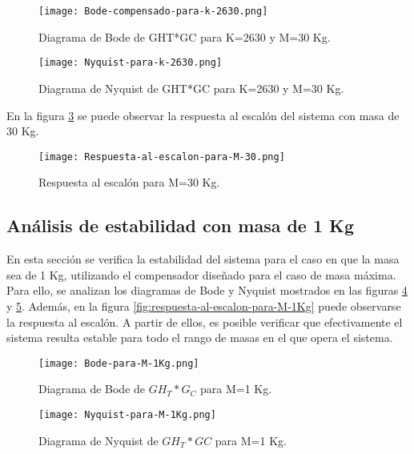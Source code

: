 \begin{figure}[H]
	\centering
	\texttt{[image: Bode-compensado-para-k-2630.png]}
	\caption{Diagrama de Bode de GHT*GC para K=2630 y M=30 Kg.}
	\label{fig:bode-compensado-para-k-2630}
\end{figure}

\begin{figure}[H]
	\centering
	\texttt{[image: Nyquist-para-k-2630.png]}
	\caption{Diagrama de Nyquist de GHT*GC para K=2630 y M=30 Kg.}
	\label{fig:nyquist-para-k-2630}
\end{figure}

\noindent En la figura \ref{fig:respuesta-al-escalon-para-M-30} se puede observar la respuesta al escal\'{o}n del sistema con masa de 30 Kg.


\begin{figure}[H]
	\centering
	\texttt{[image: Respuesta-al-escalon-para-M-30.png]}
	\caption{Respuesta al escalón para M=30 Kg.}
	\label{fig:respuesta-al-escalon-para-M-30}
\end{figure}

\subsection{Análisis de estabilidad con masa de 1 Kg}

\noindent En esta secci\'{o}n se verifica la estabilidad del sistema  para el caso en que la masa sea de 1 Kg, utilizando el compensador dise\~{n}ado para el caso de masa m\'{a}xima. Para ello, se analizan los diagramas de Bode y Nyquist mostrados en las figuras \ref{fig:bode-para-M-1Kg} y \ref{fig:nyquist-para-M-1Kg}. Adem\'{a}s, en la figura \ref{fig:respuesta-al-escalon-para-M-1Kg} puede observarse la respuesta al escal\'{o}n. A partir de ellos, es posible verificar que efectivamente el sistema resulta estable para todo el rango de masas en el que opera el sistema. 


\begin{figure}[H]
	\centering
	\texttt{[image: Bode-para-M-1Kg.png]}
	\caption{Diagrama de Bode de $GH_T*G_C$ para M=1 Kg.}
	\label{fig:bode-para-M-1Kg}
\end{figure}

\begin{figure}[H]
	\centering
	\texttt{[image: Nyquist-para-M-1Kg.png]}
	\caption{Diagrama de Nyquist de $GH_T*GC$ para M=1 Kg.}
	\label{fig:nyquist-para-M-1Kg}
\end{figure}

